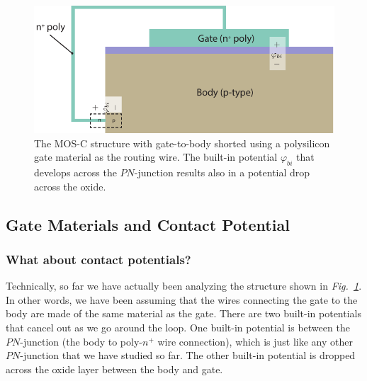 \begin{figure}[t]
\centering
\includegraphics[width=.95\columnwidth]{mos_cap_short_phibi}
\caption{The MOS-C structure with gate-to-body shorted using a polysilicon gate material as the routing wire.  The built-in potential $\varphi_{bi}$ that develops across the $PN$-junction results also in a  potential drop across the oxide.}
\label{fig:mos_cap_gate_body_short_gate}
\end{figure}
\subsection{Gate Materials and Contact Potential}
\subsubsection{What about contact potentials?}
Technically, so far we have actually been analyzing the structure shown in \emph{Fig.~\ref{fig:mos_cap_gate_body_short_gate}}.  In other words, we have been assuming that the wires connecting the gate to the body are made of the same material as the gate.  There are two built-in potentials that cancel out as we go around the loop. One built-in potential is between the $PN$-junction (the body to poly-$n^+$ wire connection), which is just like any other $PN$-junction that we have studied so far.  The other built-in potential is dropped across the oxide layer between the body and gate.  
